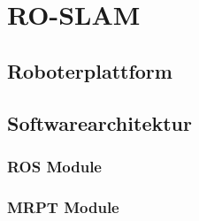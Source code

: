 \chapter{RO-SLAM}

\section{Roboterplattform}

\section{Softwarearchitektur}

\subsection{ROS Module}

\subsection{MRPT Module}